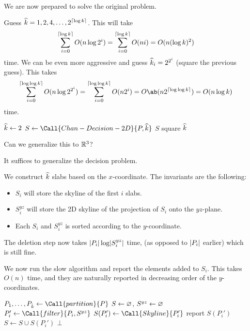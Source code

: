 We are now prepared to solve the original problem.
\begin{solution}
    Guess $\widehat{k} = 1, 2, 4, \ldots, 2^{\lceil\log k\rceil}$.
    This will take \[
        \sum_{i=0}^{\lceil\log k\rceil} O(n \log 2^i)
            = \sum_{i=0}^{\lceil\log k\rceil} O(n i)
            = O(n (\log k)^2)
    \] time.
    We can be even more aggressive and guess
    $\widehat{k}_i = 2^{2^i}$ (square the previous guess).
    This takes \[
        \sum_{i=0}^{\ceil{\log \log k}} O(n \log 2^{2^i})
            = \sum_{i=0}^{\ceil{\log \log k}} O(n 2^i)
            = O\ab(n 2^{\ceil{\log \log k}})
            = O(n \log k)
    \] time.
    \begin{algo}
            \State $\widehat{k} \gets 2$
                \State $S \gets \Call{Chan-Decision-2D}{P, \what{k}}$
                    \State \Return $S$
                \EndIf
                \State square $\widehat{k}$
            \EndFor
        \EndFn
    \end{algo}
\end{solution}

\begin{question*}
    Can we generalize this to $\mathbb{R}^3$?
\end{question*}
It suffices to generalize the decision problem.

\begin{solution}
    We construct $\widehat{k}$ slabs based on the $x$-coordinate.
    The invariants are the following:
    \begin{itemize}
        \item $S_i$ will store the skyline of the first $i$ slabs.
        \item $S_i^{yz}$ will store the 2D skyline of the projection of
            $S_i$ onto the $yz$-plane.
        \item Each $S_i$ and $S_i^{yz}$ is sorted according to the
            $y$-coordinate.
    \end{itemize}
    The deletion step now takes $\lvert P_i\rvert \log \lvert S_i^{yz}\rvert$ time,
    (as opposed to $\lvert P_i\rvert$ earlier)
    which is still fine.

    We now run the slow algorithm and report the elements added to $S_i$.
    This takes $O(n)$ time, and they are naturally reported in decreasing
    order of the $y$-coordinates.
    \begin{algo}[.7]
            \State $P_1, \ldots, P_{\hat{k}} \gets
                \Call{partition}{P}$
            \State $S \gets \varnothing$, $S^{yz} \gets \varnothing$
                \State $P_i' \gets \Call{filter}{P_i, S^{yz}}$
                \State $S(P_i') \gets \Call{Skyline}{P_i'}$
                \State report $S(P_i')$
                \State $S \gets S \cup S(P_i')$
                    \State \Return $\bot$
                \EndIf
            \EndFor
        \EndFn
    \end{algo}
\end{solution}

